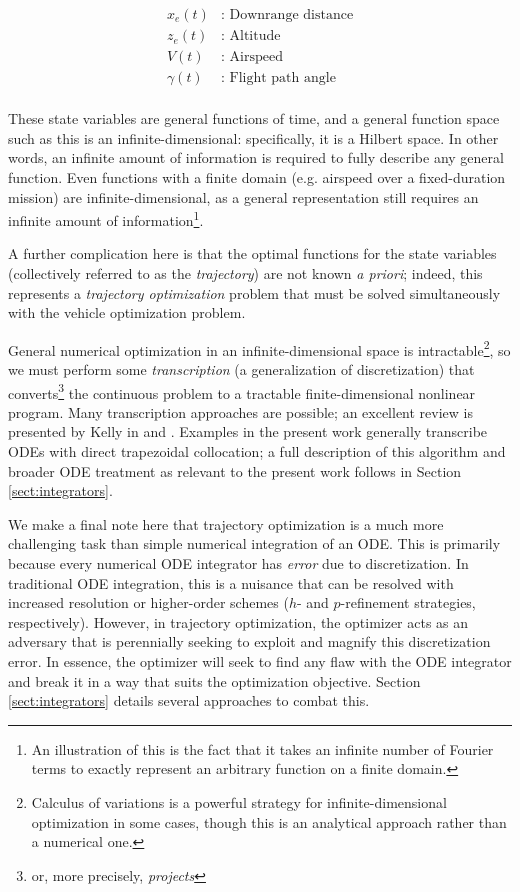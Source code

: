 \begin{equation}
    \begin{aligned}
        x_e(t)&\text{: Downrange distance}\\
        z_e(t)&\text{: Altitude}\\
        V(t)&\text{: Airspeed}\\
        \gamma(t)&\text{: Flight path angle}\\
    \end{aligned}
    \label{eq:fd-vars-subbed}
\end{equation}

These state variables are general functions of time, and a general function space such as this is an infinite-dimensional: specifically, it is a Hilbert space. In other words, an infinite amount of information is required to fully describe any general function. Even functions with a finite domain (e.g. airspeed over a fixed-duration mission) are infinite-dimensional, as a general representation still requires an infinite amount of information\footnote{An illustration of this is the fact that it takes an infinite number of Fourier terms to exactly represent an arbitrary function on a finite domain.}.

A further complication here is that the optimal functions for the state variables (collectively referred to as the \textit{trajectory}) are not known \textit{a priori}; indeed, this represents a \textit{trajectory optimization} problem that must be solved simultaneously with the vehicle optimization problem.

General numerical optimization in an infinite-dimensional space is intractable\footnote{Calculus of variations is a powerful strategy for infinite-dimensional optimization in some cases, though this is an analytical approach rather than a numerical one.}, so we must perform some \textit{transcription} (a generalization of discretization) that converts\footnote{or, more precisely, \textit{projects}} the continuous problem to a tractable finite-dimensional nonlinear program. Many transcription approaches are possible; an excellent review is presented by Kelly in \cite{mpk2015} and \cite{mpk2017}. Examples in the present work generally transcribe ODEs with direct trapezoidal collocation; a full description of this algorithm and broader ODE treatment as relevant to the present work follows in Section \ref{sect:integrators}.

We make a final note here that trajectory optimization is a much more challenging task than simple numerical integration of an ODE. This is primarily because every numerical ODE integrator has \textit{error} due to discretization. In traditional ODE integration, this is a nuisance that can be resolved with increased resolution or higher-order schemes ($h$- and $p$-refinement strategies, respectively). However, in trajectory optimization, the optimizer acts as an adversary that is perennially seeking to exploit and magnify this discretization error. In essence, the optimizer will seek to find any flaw with the ODE integrator and break it in a way that suits the optimization objective. Section \ref{sect:integrators} details several approaches to combat this.

